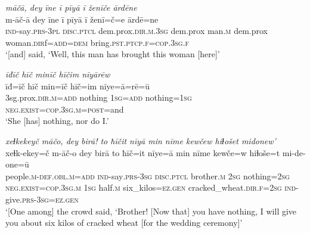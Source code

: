 \ea \label{ZP.115}
\textit{māčā, dey īne ī pīyā ī ženīče ārdēne} \\ 
\gll m-āč-ā dey īne ī pīyā ī ženī=č=e ārdē=ne \\ 
 \textsc{ind-}say\textsc{.prs}\textsc{-3pl} \textsc{disc.ptcl} dem.prox\textsc{.dir}\textsc{.m}\textsc{.3sg} dem.prox man\textsc{.m} dem.prox woman\textsc{.dir}f\textsc{=add}\textsc{=dem} bring\textsc{.pst}\textsc{.ptcp}\textsc{.f}\textsc{=cop}\textsc{.3sg}\textsc{.f} \\ 
\glt `[and] said, ‘Well, this man has brought this woman [here]'
\z 
 
\ea \label{ZP.117}
\textit{īđīč hīč minīč hīčim nīyārēw} \\ 
\gll īđ=īč hīč min=īč hīč=im nīye=ā=rē=ū \\ 
 3sg.prox\textsc{.dir}\textsc{.m}\textsc{=add} nothing \textsc{1sg}\textsc{=add} nothing\textsc{=\textsc{1sg}} \textsc{\textsc{neg.}exist}\textsc{=cop}\textsc{.3sg}\textsc{.m}\textsc{=\textsc{post}}=and \\ 
\glt `She [has] nothing, nor do I.'
\z 
 
\ea \label{ZP.118}
\textit{xeɫkekeyč māčo, dey birā! to ħīčit nīyā min nīme kewčew hiɫošet midonew’} \\ 
\gll xeɫk-ekey=č m-āč-o dey birā to ħīč=it nīye=ā min nīme kewče=w hiɫoše=t mi-de-one=ū \\ 
 people\textsc{.m}\textsc{-def}\textsc{.obl}\textsc{.m}\textsc{=add} \textsc{ind-}say\textsc{.prs}\textsc{-3sg} \textsc{disc.ptcl} brother\textsc{.m} \textsc{2sg} nothing\textsc{=\textsc{2sg}} \textsc{\textsc{neg.}exist}\textsc{=cop}\textsc{.3sg}\textsc{.m} \textsc{1sg} half\textsc{.m} six\_kilos\textsc{\textsc{=ez.gen}} cracked\_wheat\textsc{.dir}\textsc{.f}\textsc{=\textsc{2sg}} \textsc{ind-}give\textsc{.prs}\textsc{-3sg}\textsc{\textsc{=ez.gen}} \\ 
\glt `[One among] the crowd said, ‘Brother! [Now that] you have nothing, I will give you about six kilos of cracked wheat [for the wedding ceremony]'
\z 
 
